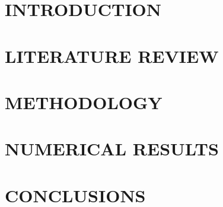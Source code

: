 \documentclass[a4paper,13pt,3p,twoside]{report}
\theoremstyle{definition}
\begin{document}
\renewcommand{\listtablename}{LIST OF TABLES}
{\let\oldnumberline\numberline
\renewcommand{\numberline}{Table~\oldnumberline}
\listoftables}

\glsaddall 
\renewcommand*{\acronymname}{LIST OF ABBREVIATIONS}
\renewcommand*{\entryname}{Abbreviation}
\renewcommand*{\descriptionname}{Definition}
\printnoidxglossaries

\renewcommand\appendixname{APPENDIX}
\renewcommand\appendixpagename{APPENDIX}
\renewcommand\appendixtocname{APPENDIX}

\renewcommand{\figurename}{Figure}
\renewcommand{\tablename}{Table}
\renewcommand{\chaptername}{CHAPTER}



\newpage
{}

\pagestyle{fancy}
\fancyhf{}
\fancyhead[RE, LO]{\leftmark}
\fancyfoot[RE, LO]{\thepage}

\chapter{INTRODUCTION}

\newpage
\chapter{LITERATURE REVIEW}



\newpage
\chapter{METHODOLOGY}


\newpage
\chapter{NUMERICAL RESULTS}


\newpage
\chapter{CONCLUSIONS}

\end{document}
